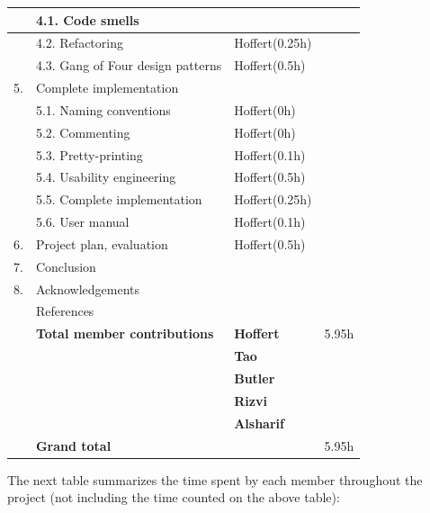 \documentclass[12pt,a4paper]{article}
\begin{document}
\begin{longtable}{| p{0.2cm} p{6.25cm} | p{3cm}| p{5cm} |}
   & 4.1. Code smells &  &  \\ \hline
   & 4.2. Refactoring & Hoffert(0.25h) &  \\ \hline
   & 4.3. Gang of Four design patterns & Hoffert(0.5h) &  \\ \hline
  5. & Complete implementation &  &  \\ \hline
   & 5.1. Naming conventions & Hoffert(0h) &  \\ \hline
   & 5.2. Commenting & Hoffert(0h) &  \\ \hline
   & 5.3. Pretty-printing & Hoffert(0.1h) &  \\ \hline
   & 5.4. Usability engineering & Hoffert(0.5h) &  \\ \hline
   & 5.5. Complete implementation & Hoffert(0.25h) &  \\ \hline
   & 5.6. User manual & Hoffert(0.1h) &  \\ \hline
  6. & Project plan, evaluation & Hoffert(0.5h) &  \\ \hline
  7. & Conclusion &  &  \\ \hline
  8. & Acknowledgements &  &  \\ \hline
   & References &  &  \\ \hline
    & \textbf{Total member contributions} & \textbf{Hoffert} & 5.95h \\ \cline{3-4}
    &  & \textbf{Tao} & \\ \cline{3-4}
    &  & \textbf{Butler} & \\ \cline{3-4}
    &  & \textbf{Rizvi} & \\ \cline{3-4}
    &  & \textbf{Alsharif} & \\ \hline
    & \textbf{Grand total} &  & 5.95h \\ \hline
\end{longtable}

The next table summarizes the time spent by each member throughout the project (not including the time counted on the above table):
\end{document}

